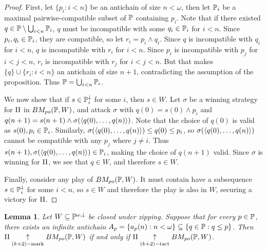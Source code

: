 \documentclass[11pt]{article}
\theoremstyle{plain}
\newtheorem{lemma}[theorem]{Lemma}
\theoremstyle{definition}
\theoremstyle{remark}
\theoremstyle{plain}
\theoremstyle{definition}
\theoremstyle{remark}
\newcommand{\bmPoGame}[2]{BM_{po}(#1,#2)}
\begin{document}
  \begin{proof}
    First, let \(\{p_i:i<n\}\) be an antichain of size \(n<\omega\),
    then let \(\mathbb{P}_i\) be a maximal pairwise-compatible subset of \(\mathbb{P}\)
    containing \(p_i\). Note that if there existed
    \(q\in\mathbb{P}\setminus\bigcup_{i<n}\mathbb{P}_i\),
    \(q\) must be incompatible with some \(q_i\in\mathbb{P}_i\) for \(i<n\).
    Since \(p_i,q_i\in\mathbb{P}_i\), they are compatible, so let
    \(r_i=p_i\wedge q_i\). Since \(q\) is incompatible with \(q_i\) for \(i<n\),
    \(q\) is incompatible with \(r_i\) for \(i<n\). Since \(p_i\) is
    incompatible with \(p_j\) for \(i<j<n\), \(r_i\) is incompatible with
    \(r_j\) for \(i<j<n\). But that makes \(\{q\}\cup\{r_i:i<n\}\) an
    antichain of size \(n+1\), contradicting the assumption of the proposition.
    Thus \(\mathbb{P}=\bigcup_{i<n}\mathbb{P}_i\).

    We now show that if \(s\in\mathbb{P}_i^\downarrow\) for some \(i\),
    then \(s\in W\). Let \(\sigma\) be a
    winning strategy for \(\mathrm{II}\) in \(\bmPoGame{\mb P}{W}\),
    and attack \(\sigma\) with \(q(0)=s(0)\wedge p_i\) and
    \(q(n+1)=s(n+1)\wedge\sigma(\langle q(0),\dots,q(n)\rangle)\). Note that the choice
    of \(q(0)\) is valid as \(s(0),p_i\in\mathbb{P}_i\). Similarly,
    \(\sigma(\langle q(0),\dots,q(n)\rangle)\leq q(0)\leq p_i\), so
    \(\sigma(\langle q(0),\dots,q(n)\rangle)\) cannot be compatible with any \(p_j\)
    where \(j\not=i\). Thus \(s(n+1),\sigma(\langle q(0),\dots,q(n)\rangle)\in\mathbb{P}_i\),
    making the choice of \(q(n+1)\) valid. Since \(\sigma\) is winning for
    \(\mathrm{II}\), we see that \(q\in W\), and therefore \(s\in W\).

    Finally, consider any play of \(\bmPoGame{\mb P}{W}\). It must contain
    have a subsequence \(s\in\mathbb{P}_i^\downarrow\) for some \(i<n\),
    so \(s\in W\) and therefore
    the play is also in \(W\), securing a victory for \(\mathrm{II}\).
  \end{proof}

  \begin{lemma}
    Let \(W\subseteq\mathbb{P}^{\omega,\downarrow}\) be closed under zipping.
    Suppose that for every \(p\in\mathbb{P}\), there exists an infinite
    antichain \(A_p=\{a_p(n):n<\omega\}\subseteq\{q\in\mathbb{P}:q\leq p\}\).
    Then \(\plII\kmarkwin{(k+2)}\bmPoGame{\mb P}{W}\) if and only if
    \(\plII\ktactwin{(k+2)}\bmPoGame{\mb P}{W}\).
  \end{lemma}
\end{document}
